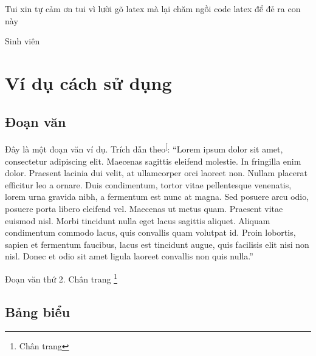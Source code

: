 \documentclass[14pt,oneside]{scrbook}
\newcommand{\toc}[0]{
\tableofcontents
\listoffigures
\listoftables
}
\begin{document}

Tui xin tự cảm ơn tui vì lười gõ latex mà lại chăm ngồi code latex để đẻ
ra con này

\begin{sign}

Sinh viên
\end{sign}

\toc

\chapter{Ví dụ cách sử
dụng}\label{vuxed-dux1ee5-cuxe1ch-sux1eed-dux1ee5ng}

\section{Đoạn văn}\label{ux111oux1ea1n-vux103n}

Đây là một đoạn văn ví dụ. Trích dẫn
theo\textsuperscript{{[}\citeproc{ref-texbook}{1}{]}}: ``Lorem ipsum
dolor sit amet, consectetur adipiscing elit. Maecenas sagittis eleifend
molestie. In fringilla enim dolor. Praesent lacinia dui velit, at
ullamcorper orci laoreet non. Nullam placerat efficitur leo a ornare.
Duis condimentum, tortor vitae pellentesque venenatis, lorem urna
gravida nibh, a fermentum est nunc at magna. Sed posuere arcu odio,
posuere porta libero eleifend vel. Maecenas ut metus quam. Praesent
vitae euismod nisl. Morbi tincidunt nulla eget lacus sagittis aliquet.
Aliquam condimentum commodo lacus, quis convallis quam volutpat id.
Proin lobortis, sapien et fermentum faucibus, lacus est tincidunt augue,
quis facilisis elit nisi non nisl. Donec et odio sit amet ligula laoreet
convallis non quis nulla.''

Đoạn văn thứ 2. Chân trang \footnote{Chân trang}

\section{Bảng biểu}\label{bux1ea3ng-biux1ec3u}
\end{document}
